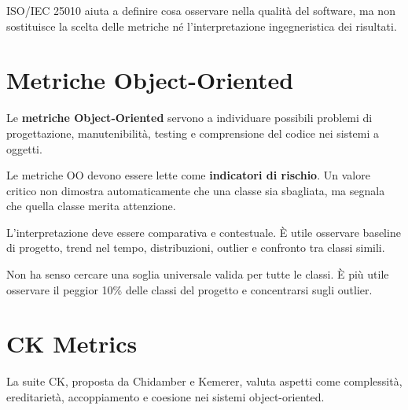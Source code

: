 \begin{notaesame}
ISO/IEC 25010 aiuta a definire cosa osservare nella qualità del software, ma non sostituisce la scelta delle metriche né l'interpretazione ingegneristica dei risultati.
\end{notaesame}

\section{Metriche Object-Oriented}

Le \textbf{metriche Object-Oriented} servono a individuare possibili problemi di progettazione, manutenibilità, testing e comprensione del codice nei sistemi a oggetti.

\begin{notaesame}
Le metriche OO devono essere lette come \textbf{indicatori di rischio}. Un valore critico non dimostra automaticamente che una classe sia sbagliata, ma segnala che quella classe merita attenzione.
\end{notaesame}

L'interpretazione deve essere comparativa e contestuale. È utile osservare baseline di progetto, trend nel tempo, distribuzioni, outlier e confronto tra classi simili.

\begin{notaprof}
Non ha senso cercare una soglia universale valida per tutte le classi. È più utile osservare il peggior 10\% delle classi del progetto e concentrarsi sugli outlier.
\end{notaprof}

\section{CK Metrics}

\begin{notaslide}
La suite CK, proposta da Chidamber e Kemerer, valuta aspetti come complessità, ereditarietà, accoppiamento e coesione nei sistemi object-oriented.
\end{notaslide}

